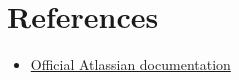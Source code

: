 \newpage
\chapter{References}

\begin{itemize}
    \item \href{https://support.atlassian.com/jira-service-management-cloud/docs/use-advanced-search-with-jira-query-language-jql/}{Official Atlassian documentation}
\end{itemize}